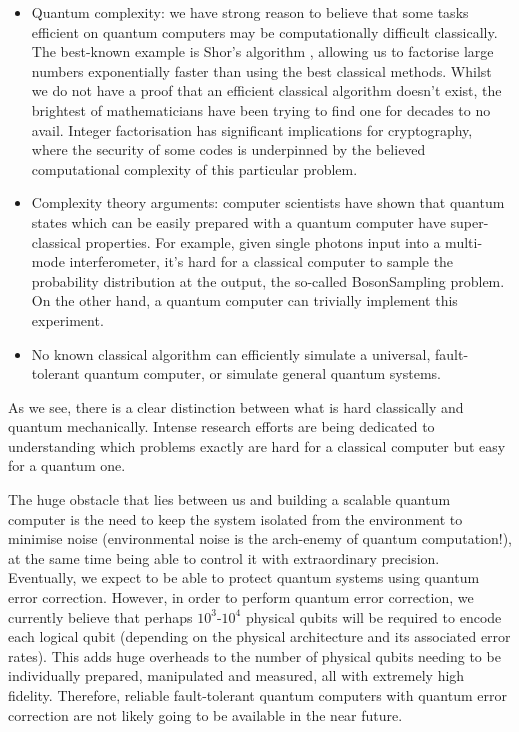 \begin{itemize}
\item Quantum complexity: we have strong reason to believe that some tasks efficient on quantum computers may be computationally difficult classically. The best-known example is Shor's algorithm \cite{bib:ShorFactor}, allowing us to factorise large numbers exponentially  faster than using the best classical methods. Whilst we do not have a proof that an efficient classical algorithm doesn't exist, the brightest of mathematicians have been trying to find one for decades to no avail. Integer factorisation has significant implications for cryptography, where the security of some codes is underpinned by the believed computational complexity of this particular problem. 
\item Complexity theory arguments: computer scientists have shown that quantum states which can be easily prepared with a quantum computer have super-classical properties. For example, given single photons input into a multi-mode interferometer, it's hard for a classical computer to sample the probability distribution at the output, the so-called {\sc BosonSampling} problem. On the other hand, a quantum computer can trivially implement this experiment.
\item No known classical algorithm can efficiently simulate a universal, fault-tolerant quantum computer, or simulate general quantum systems.
\end{itemize}

As we see, there is a clear distinction between what is hard classically and quantum mechanically. Intense research efforts are being dedicated to understanding which problems exactly are hard for a classical computer but easy for a quantum one.

The huge obstacle that lies between us and building a scalable quantum computer is the need to keep the system isolated from the environment to minimise noise (environmental noise is the arch-enemy of quantum computation!), at the same time being able to control it with extraordinary precision. Eventually, we expect to be able to protect quantum systems using quantum error correction. However, in order to perform quantum error correction, we currently believe that perhaps $10^3$-$10^4$ physical qubits will be required to encode each logical qubit (depending on the physical architecture and its associated error rates). This adds huge overheads to the number of physical qubits needing to be individually prepared, manipulated and measured, all with extremely high fidelity. Therefore, reliable fault-tolerant quantum computers with quantum error correction are not likely going to be available in the near future.

